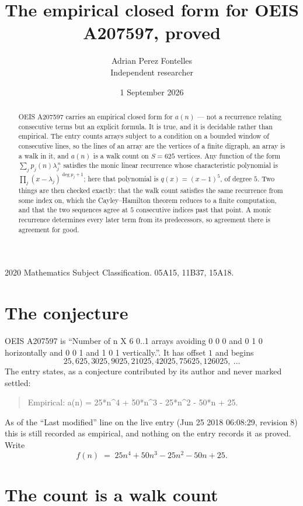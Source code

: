 \documentclass[11pt,a4paper]{article}
\title{The empirical closed form for OEIS A207597, proved}
\author{Adrian Perez Fontelles\\ \small Independent researcher}
\date{1 September 2026}
\theoremstyle{plain}
\theoremstyle{definition}
\begin{document}
\maketitle

\begin{abstract}
OEIS A207597 carries an empirical closed form for $a(n)$ --- not a recurrence relating
consecutive terms but an explicit formula. It is true, and it is decidable rather than
empirical. The entry counts arrays subject to a condition on a bounded window of consecutive lines, so the lines of an array are the
vertices of a finite digraph, an array is a walk in it, and $a(n)$ is a walk count on
$S=625$ vertices. Any function of the form $\sum_j p_j(n)\lambda_j^{\,n}$ satisfies the
monic linear recurrence whose characteristic polynomial is
$\prod_j(x-\lambda_j)^{\deg p_j+1}$; here that polynomial is $q(x)=(x-1)^{5}$, of degree
$5$. Two things are then checked exactly: that the walk count satisfies the same
recurrence from some index on, which the Cayley--Hamilton theorem reduces to a finite
computation, and that the two sequences agree at $5$ consecutive indices past that
point. A monic recurrence determines every later term from its predecessors, so agreement
there is agreement for good.
\end{abstract}

\noindent\small 2020 Mathematics Subject Classification. 05A15, 11B37, 15A18.\normalsize

\section{The conjecture}

OEIS A207597 is ``Number of n X 6 0..1 arrays avoiding 0 0 0 and 0 1 0 horizontally and 0 0 1 and 1 0 1 vertically.''. It has offset $1$ and begins
\[
25, 625, 3025, 9025, 21025, 42025, 75625, 126025,\ \dots
\]
The entry states, as a conjecture contributed by its author and never marked settled:
\begin{quote}
Empirical: a(n) = 25*n\^{}4 + 50*n\^{}3 - 25*n\^{}2 - 50*n + 25.
\end{quote}
As of the ``Last modified'' line on the live entry (Jun 25 2018 06:08:29, revision 8) this is still
recorded as empirical, and nothing on the entry records it as proved. Write
\[
f(n)\;=\;25 n^{4} + 50 n^{3} - 25 n^{2} - 50 n + 25.
\]

\section{The count is a walk count}
\end{document}
